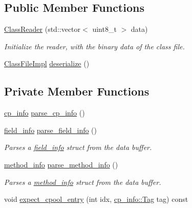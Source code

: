 \subsection*{Public Member Functions}
\begin{DoxyCompactItemize}
\item 
\hyperlink{classClassReader_a3470778a3f6fe462416950a69c305ff0}{Class\+Reader} (std\+::vector$<$ uint8\+\_\+t $>$ data)
\begin{DoxyCompactList}\small\item\em Initialize the reader, with the binary {\ttfamily data} of the class file. \end{DoxyCompactList}\item 
\hyperlink{classClassFileImpl}{Class\+File\+Impl} \hyperlink{classClassReader_a001cc48324c31430559b43976d731e8a}{deserialize} ()
\end{DoxyCompactItemize}
\subsection*{Private Member Functions}
\begin{DoxyCompactItemize}
\item 
\hyperlink{structcp__info}{cp\+\_\+info} \hyperlink{classClassReader_ac4c0b613d45cf507b2e85c61c28541cb}{parse\+\_\+cp\+\_\+info} ()
\item 
\hyperlink{structfield__info}{field\+\_\+info} \hyperlink{classClassReader_a434b73f04e1502c936593ab63094d838}{parse\+\_\+field\+\_\+info} ()
\begin{DoxyCompactList}\small\item\em Parses a \hyperlink{structfield__info}{field\+\_\+info} struct from the data buffer. \end{DoxyCompactList}\item 
\hyperlink{structmethod__info}{method\+\_\+info} \hyperlink{classClassReader_a0eb68204b1979e2a2758c05f200a7be3}{parse\+\_\+method\+\_\+info} ()
\begin{DoxyCompactList}\small\item\em Parses a \hyperlink{structmethod__info}{method\+\_\+info} struct from the data buffer. \end{DoxyCompactList}\item 
void \hyperlink{classClassReader_a7f8a951758bdb961ebf36088301ac1b4}{expect\+\_\+cpool\+\_\+entry} (int idx, \hyperlink{structcp__info_acdef8472ed83e12e3a87bca8d6001f69}{cp\+\_\+info\+::\+Tag} tag) const
\end{DoxyCompactItemize}
